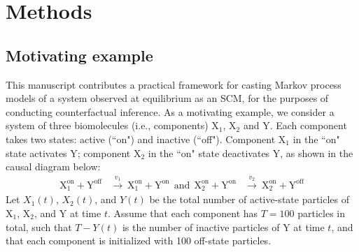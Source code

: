 \documentclass{article}
\begin{document}


\section{Methods}
\subsection{Motivating example}

This manuscript contributes a practical framework for casting Markov process models of a system observed at equilibrium as an SCM, for the purposes of conducting counterfactual inference. As a motivating example, we consider a system of three biomolecules (i.e., components) $\mbox{X}_1$, $\mbox{X}_2$ and $\mbox{Y}$. Each component takes two states: active (``on") and inactive (``off"). Component $\mbox{X}_1$ in the ``on" state activates $\mbox{Y}$; component $\mbox{X}_2$ in the ``on" state deactivates $\mbox{Y}$, as shown in the causal diagram \cite{alon2006introduction} below:
\begin{eqnarray}
\mbox{X}_1^{\text{on}} + \mbox{Y}^{\text{off}}   &\overset{v_1}{\rightarrow} \ \mbox{X}_1^{\text{on}} + \mbox{Y}^{\text{on}} \label{e1}\  \ \mbox{and}\ \
\mbox{X}_2^{\text{on}} + \mbox{Y}^{\text{on}} &\overset{v_2}{\rightarrow} \ \mbox{X}_2^{\text{on}} + \mbox{Y}^{\text{off}}
\end{eqnarray}
Let $X_1(t)$, $X_2(t)$, and $Y(t)$ be the total number of active-state particles of $\mbox{X}_1$, $\mbox{X}_2$, and $\mbox{Y}$  at time $t$. Assume that each component has $T=100$ particles in total, such that $T - Y(t)$ is the number of inactive particles of $\mbox{Y}$ at time $t$, and that each component is initialized with 100 off-state particles. 
\end{document}
